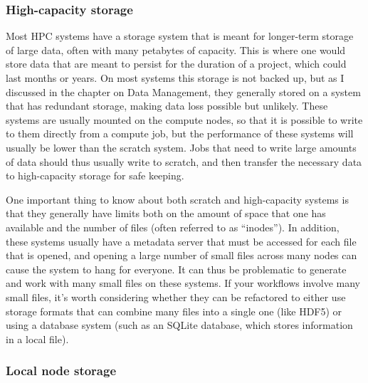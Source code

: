 \subsubsection{High-capacity storage}

Most HPC systems have a storage system that is meant for longer-term storage of large data, often with many petabytes of capacity.  This is where one would store data that are meant to persist for the duration of a project, which could last months or years. On most systems this storage is not backed up, but as I discussed in the chapter on Data Management, they  generally stored on a system that has redundant storage, making data loss possible but unlikely.  These systems are usually mounted on the compute nodes, so that it is possible to write to them directly from a compute job, but the performance of these systems will usually be lower than the scratch system.  Jobs that need to write large amounts of data should thus usually write to scratch, and then transfer the necessary data to high-capacity storage for safe keeping.

One important thing to know about both scratch and high-capacity systems is that they generally have limits both on the amount of space that one has available and the number of files (often referred to as ``inodes'').  In addition, these systems usually have a metadata server that must be accessed for each file that is opened, and opening a large number of small files across many nodes can cause the system to hang for everyone.  It can thus be problematic to generate and work with many small files on these systems.  If your workflows involve many small files, it's worth considering whether they can be refactored to either use storage formats that can combine many files into a single one (like HDF5) or using a database system (such as an SQLite database, which stores information in a local file).

\subsubsection{Local node storage}

